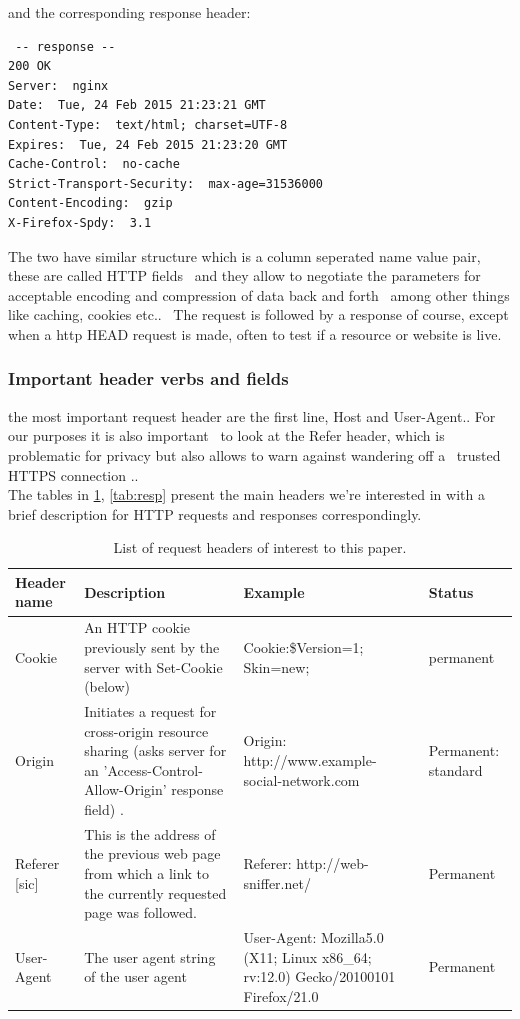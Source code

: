 \documentclass[a4paper,12pt]{paper}
\begin{document}
and the corresponding response header:

\begin{verbatim}
 -- response --
200 OK
Server:  nginx
Date:  Tue, 24 Feb 2015 21:23:21 GMT
Content-Type:  text/html; charset=UTF-8
Expires:  Tue, 24 Feb 2015 21:23:20 GMT
Cache-Control:  no-cache
Strict-Transport-Security:  max-age=31536000
Content-Encoding:  gzip
X-Firefox-Spdy:  3.1
\end{verbatim}

The two have similar structure which is a column seperated name value pair, these are called HTTP fields \
and they allow to negotiate the parameters for acceptable encoding and compression of data back and forth \
among other things like caching, cookies etc.. \
The request is followed by a response of course, except when a http HEAD request is made, often to test if a resource or website is live.\\

\subsubsection{Important header verbs and fields}

the most important request header are the first line, Host and User-Agent.. For our purposes it is also important \
to look at the Refer header, which is problematic for privacy but also allows to warn against wandering off a \
trusted HTTPS connection ..\\

The tables in \ref{tab:req}, \ref{tab:resp} present the main headers we're interested in with a brief description for HTTP requests and responses correspondingly.\

\begin{table}
\centering
\begin{tabular}{p{2cm}|p{6cm}|p{4cm}|p{2cm}}
Header name & Description & Example & Status \\\hline

Cookie & An HTTP cookie previously sent by the server with Set-Cookie (below) & Cookie:\$Version=1; Skin=new; & permanent \\
Origin &Initiates a request for cross-origin resource sharing (asks server for an 'Access-Control-Allow-Origin' response field) . & Origin: http://www.example-social-network.com & Permanent: standard\\
Referer [sic] & This is the address of the previous web page from which a link to the currently requested page was followed. & Referer: http://web-sniffer.net/ & Permanent\\
User-Agent & The user agent string of the user agent & User-Agent: Mozilla\/5.0 (X11; Linux x86\_64; rv:12.0) Gecko/20100101 Firefox/21.0 &Permanent
\end{tabular}
\caption{\label{tab:req}List of request headers of interest to this paper.}
\end{table}
\end{document}
